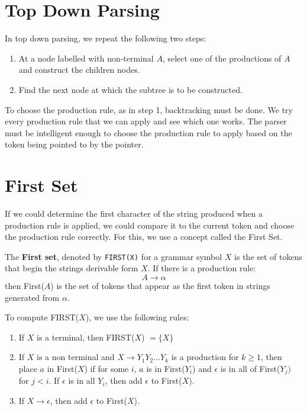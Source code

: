 \documentclass[12pt,letterpaper]{book}
\theoremstyle{definition}
\begin{document}
\section{Top Down Parsing}

In top down parsing, we repeat the following two steps:

\begin{enumerate}
  \item At a node labelled with non-terminal $A$, select one of the productions of $A$ and construct the children nodes.
  \item Find the next node at which the subtree is to be constructed.
\end{enumerate}

To choose the production rule, as in step 1, backtracking must be done. We try every production rule that we can apply and see which one works. The parser must be intelligent enough to choose the production rule to apply based on the token being pointed to by the pointer.

\section{First Set}

If we could determine the first character of the string produced when a production rule is applied, we could compare it to the current token and choose the production rule correctly. For this, we use a concept called the First Set.

The \textbf{First set}, denoted by \texttt{FIRST(X)} for a grammar symbol $X$ is the set of tokens that begin the strings derivable form $X$. If there is a production rule:
\[A \rightarrow \alpha\]
then First($A$) is the set of tokens that appear as the first token in strings generated from $\alpha$.

To compute FIRST($X$), we use the following rules:

\begin{enumerate}
  \item If $X$ is a terminal, then FIRST($X$) $= \{X\}$
  \item If $X$ is a non terminal and $X \rightarrow Y_1Y_2...Y_k$ is a production for $k \geq 1$, then place $a$ in First($X$) if for some $i$, $a$ is in First($Y_i$) and $\epsilon$ is in all of First($Y_j)$ for $j < i$. If $\epsilon$ is in all $Y_i$, then add $\epsilon$ to First($X$).
  \item If $X \rightarrow \epsilon$, then add $\epsilon$ to First($X$).
\end{enumerate}
\end{document}
